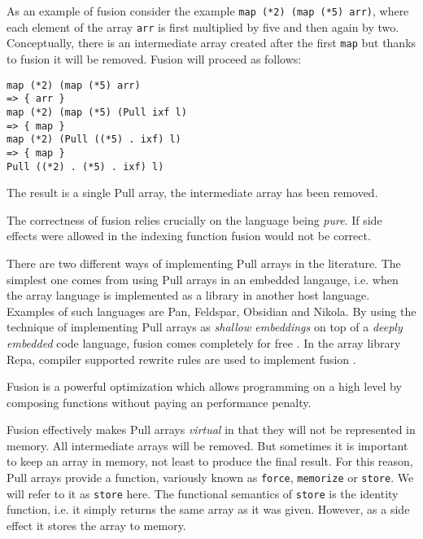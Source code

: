 \documentclass{sigplanconf}
\begin{document}
As an example of fusion consider the example
\newline
\verb!map (*2) (map (*5) arr)!, where each element of the array
\verb!arr! is first multiplied by five and then again by
two. Conceptually, there is an intermediate array created after the
first \verb!map! but thanks to fusion it will be removed. Fusion will proceed
as follows:

\begin{verbatim}
map (*2) (map (*5) arr)
=> { arr }
map (*2) (map (*5) (Pull ixf l)
=> { map }
map (*2) (Pull ((*5) . ixf) l)
=> { map }
Pull ((*2) . (*5) . ixf) l)
\end{verbatim}

The result is a single Pull array, the intermediate array has been removed.

The correctness of fusion relies crucially on the language being
\emph{pure}. If side effects were allowed in the indexing function
fusion would not be correct.

There are two different ways of implementing Pull arrays in the
literature. The simplest one comes from using Pull arrays in an
embedded langauge, i.e. when the array language is implemented as a
library in another host language. Examples of such languages are
Pan\cite{elliott2003compiling}, Feldspar\cite{Axelsson:2010:Feldspar},
Obsidian\cite{Svensson:2011:Obsidian} and
Nikola\cite{Mainland:2010:Nikola}. By using the technique of
implementing Pull arrays as \emph{shallow embeddings} on top of a
\emph{deeply embedded} code language, fusion comes completely for free
\cite{svenningsson2013combining}.
In the array library Repa\cite{keller2010regular}, compiler supported
rewrite rules are used to implement fusion \cite{jones2001playing}.

Fusion is a powerful optimization which allows programming on a high
level by composing functions without paying an performance penalty.

Fusion effectively makes Pull arrays \emph{virtual} in that they will
not be represented in memory. All intermediate arrays will be
removed. But sometimes it is important to keep an array in memory, not
least to produce the final result. For this reason, Pull arrays
provide a function, variously known as \verb!force!, \verb!memorize!
  or \verb!store!. We will refer to it as \verb!store! here. The
  functional semantics of \verb!store! is the identity function,
  i.e. it simply returns the same array as it was given. However, as a
  side effect it stores the array to memory.
\end{document}
